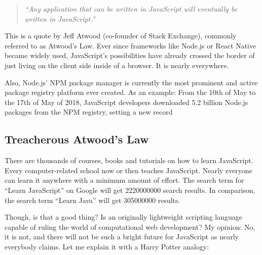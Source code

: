 \documentclass[10pt]{article}
\begin{document}
\begin{sloppypar}
  \begin{quote}
    \emph{“Any application that can be written in JavaScript will eventually be written in JavaScript.” \citep{atwood_principle_2007}}
  \end{quote}

  This is a quote by Jeff Atwood (co-founder of Stack Exchange), commonly referred to as Atwood’s Law. Ever since frameworks like Node.js or React Native became widely used, JavaScript’s possibilities have already crossed the border of just living on the client side inside of a browser. It is nearly everywhere.

  Also, Node.js’ NPM package manager is currently the most prominent and active package registry platform ever created. As an example: From the 10th of May to the 17th of May of 2018, JavaScript developers downloaded 5.2 billion Node.js packages from the NPM registry, setting a new record \citep{npm_how_2018}

  \begin{figure}[ht]
    \centering
    \label{fig:atwood-law}
  \end{figure}

  \subsection{Treacherous Atwood’s Law}
  \label{sec:atwood-law}

  There are thousands of courses, books and tutorials on how to learn JavaScript. Every computer-related school now or then teaches JavaScript. Nearly everyone can learn it anywhere with a minimum amount of effort. The search term for “Learn JavaScript” on Google will get \num{2220000000} search results. In comparison, the search term “Learn Java” will get \num{305000000} results.

  Though, is that a good thing? Is an originally lightweight scripting language capable of ruling the world of computational web development? My opinion: No, it is not, and there will not be such a bright future for JavaScript as nearly everybody claims. Let me explain it with a Harry Potter analogy:


\end{sloppypar}
\end{document}

